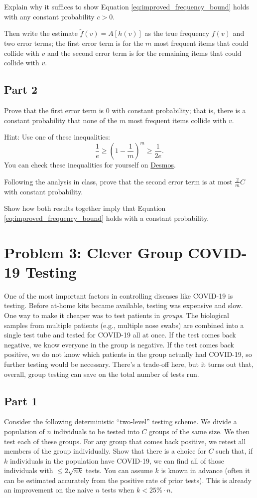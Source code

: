 \documentclass{article}
\begin{document}
Explain why it suffices to show Equation \ref{eq:improved_frequency_bound} holds with any constant probability $c > 0$.

Then write the estimate $\tilde{f}(v) = A[h(v)]$ as the true frequency $f(v)$ and two error terms; the first error term is for the $m$ most frequent items that could collide with $v$ and the second error term is for the remaining items that could collide with $v$.

\subsection*{Part 2}
Prove that the first error term is 0 with constant probability; that is, there is a constant probability that none of the $m$ most frequent items collide with $v$.

Hint: Use one of these inequalities: $$\frac1{e} \geq \left(1-\frac1{m}\right)^m \geq \frac{1}{2e}.$$ You can check these inequalities for yourself on \href{https://www.desmos.com/calculator/bok5upfowo}{Desmos}.

Following the analysis in class, prove that the second error term is at most $\frac{2}{m}C$ with constant probability.

Show how both results together imply that Equation \ref{eq:improved_frequency_bound} holds with a constant probability.

%

\newpage \section*{Problem 3: Clever Group COVID-19 Testing}

One of the most important factors in controlling diseases like COVID-19 is testing. Before at-home kits became available, testing was expensive and slow. One way to make it cheaper was to test patients in \emph{groups}. The biological samples from multiple patients (e.g., multiple nose swabs) are combined into a single test tube and tested for COVID-19 all at once. If the test comes back negative, we know everyone in the group is negative. If the test comes back positive, we do not know which patients in the group actually had COVID-19, so further testing would be necessary. There's a trade-off here, but it turns out that, overall, group testing can save on the total number of tests run. 

\subsection*{Part 1}
Consider the following deterministic ``two-level'' testing scheme. We divide a population of $n$ individuals to be tested into $C$ groups of the same size. We then test each of these groups. For any group that comes back positive, we retest all members of the group individually. Show that there is a choice for $C$ such that, if $k$ individuals in the population have COVID-19, we can find all of those individuals with $\leq 2\sqrt{nk}$ tests. You can assume $k$ is known in advance (often it can be estimated accurately from the positive rate of prior tests). This is already an improvement on the naive $n$ tests when $k < 25\% \cdot n$.
	
\end{document}
